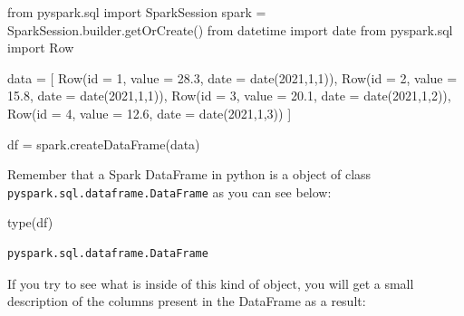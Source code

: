 \documentclass[
  11pt,
  letterpaper,
  DIV=11,
  numbers=noendperiod]{scrreprt}
\newenvironment{Shaded}{\begin{snugshade}}{\end{snugshade}}
\newcommand{\BuiltInTok}[1]{\textcolor[rgb]{0.00,0.23,0.31}{#1}}
\newcommand{\DecValTok}[1]{\textcolor[rgb]{0.68,0.00,0.00}{#1}}
\newcommand{\FloatTok}[1]{\textcolor[rgb]{0.68,0.00,0.00}{#1}}
\newcommand{\ImportTok}[1]{\textcolor[rgb]{0.00,0.46,0.62}{#1}}
\newcommand{\NormalTok}[1]{\textcolor[rgb]{0.00,0.23,0.31}{#1}}
\newcommand{\OperatorTok}[1]{\textcolor[rgb]{0.37,0.37,0.37}{#1}}
\begin{document}
\begin{Shaded}
\begin{Highlighting}[]
\ImportTok{from}\NormalTok{ pyspark.sql }\ImportTok{import}\NormalTok{ SparkSession}
\NormalTok{spark }\OperatorTok{=}\NormalTok{ SparkSession.builder.getOrCreate()}
\ImportTok{from}\NormalTok{ datetime }\ImportTok{import}\NormalTok{ date}
\ImportTok{from}\NormalTok{ pyspark.sql }\ImportTok{import}\NormalTok{ Row}

\NormalTok{data }\OperatorTok{=}\NormalTok{ [}
\NormalTok{  Row(}\BuiltInTok{id} \OperatorTok{=} \DecValTok{1}\NormalTok{, value }\OperatorTok{=} \FloatTok{28.3}\NormalTok{, date }\OperatorTok{=}\NormalTok{ date(}\DecValTok{2021}\NormalTok{,}\DecValTok{1}\NormalTok{,}\DecValTok{1}\NormalTok{)),}
\NormalTok{  Row(}\BuiltInTok{id} \OperatorTok{=} \DecValTok{2}\NormalTok{, value }\OperatorTok{=} \FloatTok{15.8}\NormalTok{, date }\OperatorTok{=}\NormalTok{ date(}\DecValTok{2021}\NormalTok{,}\DecValTok{1}\NormalTok{,}\DecValTok{1}\NormalTok{)),}
\NormalTok{  Row(}\BuiltInTok{id} \OperatorTok{=} \DecValTok{3}\NormalTok{, value }\OperatorTok{=} \FloatTok{20.1}\NormalTok{, date }\OperatorTok{=}\NormalTok{ date(}\DecValTok{2021}\NormalTok{,}\DecValTok{1}\NormalTok{,}\DecValTok{2}\NormalTok{)),}
\NormalTok{  Row(}\BuiltInTok{id} \OperatorTok{=} \DecValTok{4}\NormalTok{, value }\OperatorTok{=} \FloatTok{12.6}\NormalTok{, date }\OperatorTok{=}\NormalTok{ date(}\DecValTok{2021}\NormalTok{,}\DecValTok{1}\NormalTok{,}\DecValTok{3}\NormalTok{))}
\NormalTok{]}

\NormalTok{df }\OperatorTok{=}\NormalTok{ spark.createDataFrame(data)}
\end{Highlighting}
\end{Shaded}

Remember that a Spark DataFrame in python is a object of class
\texttt{pyspark.sql.dataframe.DataFrame} as you can see below:

\begin{Shaded}
\begin{Highlighting}[]
\BuiltInTok{type}\NormalTok{(df)}
\end{Highlighting}
\end{Shaded}

\begin{verbatim}
pyspark.sql.dataframe.DataFrame
\end{verbatim}

If you try to see what is inside of this kind of object, you will get a
small description of the columns present in the DataFrame as a result:
\end{document}
